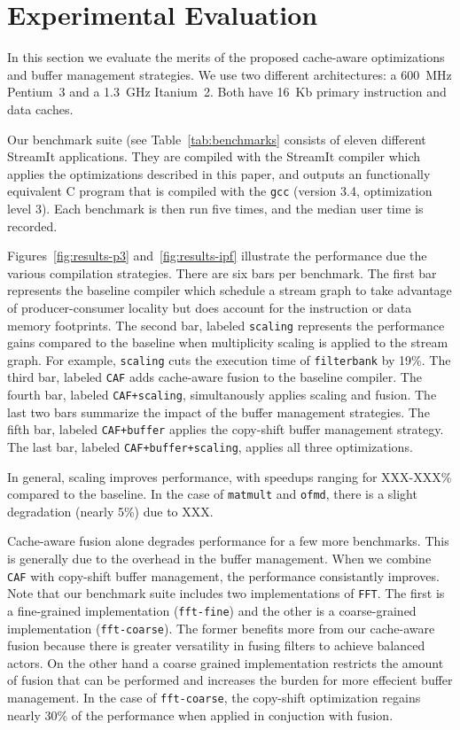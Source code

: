 \section{Experimental Evaluation}
\label{sec:evaluation}

In this section we evaluate the merits of the proposed cache-aware
optimizations and buffer management strategies. We use two
different architectures: a 600~MHz Pentium~3 and a 1.3~GHz
Itanium~2. Both have 16~Kb primary instruction and data caches.

Our benchmark suite (see Table~\ref{tab:benchmarks} consists of eleven
different StreamIt applications. They are compiled with the StreamIt
compiler which applies the optimizations described in this paper, and
outputs an functionally equivalent C program that is compiled with the
\texttt{gcc} (version 3.4, optimization level 3). Each benchmark is
then run five times, and the median user time is recorded.

Figures~\ref{fig:results-p3} and~\ref{fig:results-ipf} illustrate the
performance due the various compilation strategies. There are six bars
per benchmark. The first bar represents the baseline compiler which
schedule a stream graph to take advantage of producer-consumer
locality but does account for the instruction or data memory
footprints. The second bar, labeled {\tt scaling} represents the
performance gains compared to the baseline when multiplicity scaling
is applied to the stream graph. For example, {\tt scaling} cuts the
execution time of \texttt{filterbank} by 19\%. The third bar, labeled
{\tt CAF} adds cache-aware fusion to the baseline compiler. The fourth
bar, labeled \texttt{CAF+scaling}, simultanously applies scaling and
fusion. The last two bars summarize the impact of the buffer
management strategies. The fifth bar, labeled \texttt{CAF+buffer}
applies the copy-shift buffer management strategy. The last bar,
labeled \texttt{CAF+buffer+scaling}, applies all three optimizations.

In general, scaling improves performance, with speedups ranging for
XXX-XXX\% compared to the baseline. In the case of \texttt{matmult}
and \texttt{ofmd}, there is a slight degradation (nearly 5\%) due to
XXX.

Cache-aware fusion alone degrades performance for a few more benchmarks.
This is generally due to the overhead in the buffer management. When
we combine \texttt{CAF} with copy-shift buffer management, the
performance consistantly improves. Note that our benchmark suite
includes two implementations of \texttt{FFT}. The first is a
fine-grained implementation (\texttt{fft-fine}) and the other is a
coarse-grained implementation (\texttt{fft-coarse}). The former
benefits more from our cache-aware fusion because there is greater
versatility in fusing filters to achieve balanced actors. On the other hand
a coarse grained implementation restricts the amount of fusion that
can be performed and increases the burden for more effecient buffer
management. In the case of \texttt{fft-coarse}, the copy-shift
optimization regains nearly 30\% of the performance when applied in
conjuction with fusion.

